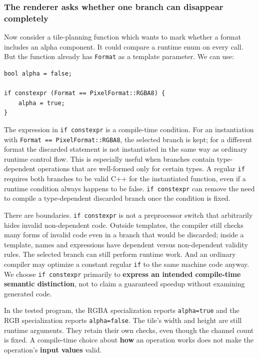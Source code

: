 \subsubsection{The renderer asks whether one branch can disappear completely}\label{the-renderer-asks-whether-one-branch-can-disappear-completely}

Now consider a tile-planning function which wants to mark whether a format includes an alpha component. It could compare a runtime enum on every call. But the function already has \texttt{Format} as a template parameter. We can use:

\begin{verbatim}
bool alpha = false;

if constexpr (Format == PixelFormat::RGBA8) {
    alpha = true;
}
\end{verbatim}

The expression in \texttt{if\ constexpr} is a compile-time condition. For an instantiation with \texttt{Format\ ==\ PixelFormat::RGBA8}, the selected branch is kept; for a different format the discarded statement is not instantiated in the same way as ordinary runtime control flow. This is especially useful when branches contain type-dependent operations that are well-formed only for certain types. A regular \texttt{if} requires both branches to be valid C++ for the instantiated function, even if a runtime condition always happens to be false. \texttt{if\ constexpr} can remove the need to compile a type-dependent discarded branch once the condition is fixed.

There are boundaries. \texttt{if\ constexpr} is not a preprocessor switch that arbitrarily hides invalid non-dependent code. Outside templates, the compiler still checks many forms of invalid code even in a branch that would be discarded; inside a template, names and expressions have dependent versus non-dependent validity rules. The selected branch can still perform runtime work. And an ordinary compiler may optimize a constant regular \texttt{if} to the same machine code anyway. We choose \texttt{if\ constexpr} primarily to \textbf{express an intended compile-time semantic distinction}, not to claim a guaranteed speedup without examining generated code.

In the tested program, the RGBA specialization reports \texttt{alpha=true} and the RGB specialization reports \texttt{alpha=false}. The tile's width and height are still runtime arguments. They retain their own checks, even though the channel count is fixed. A compile-time choice about \textbf{how} an operation works does not make the operation's \textbf{input values} valid.

